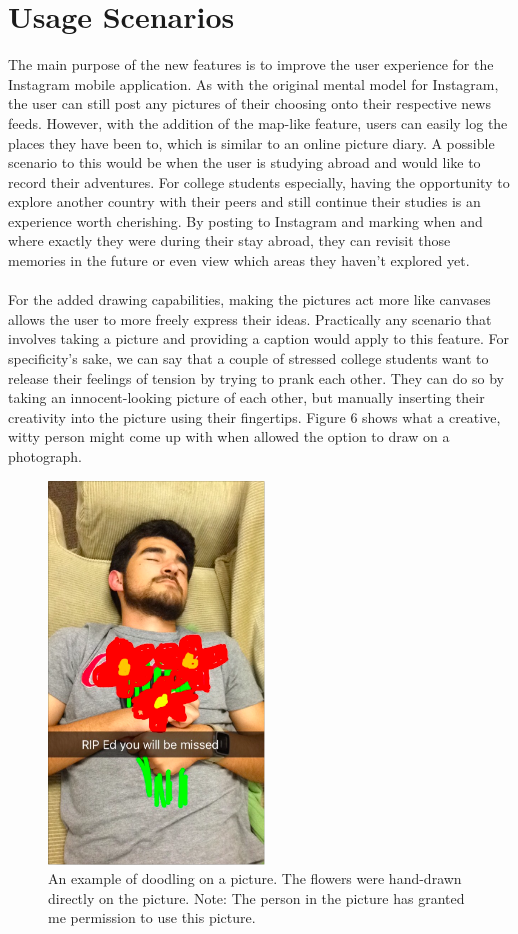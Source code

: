 \documentclass[11pt]{article}
\begin{document}
\pagebreak
   
\section{Usage Scenarios}
\label{Usage Scenarios}
   \indent
   \indent The main purpose of the new features is to improve the user experience for the Instagram mobile application. As with the original mental model for Instagram, the user can still post any pictures of their choosing onto their respective news feeds. However, with the addition of the map-like feature, users can easily log the places they have been to, which is similar to an online picture diary. A possible scenario to this would be when the user is studying abroad and would like to record their adventures. For college students especially, having the opportunity to explore another country with their peers and still continue their studies is an experience worth cherishing. By posting to Instagram and marking when and where exactly they were during their stay abroad, they can revisit those memories in the future or even view which areas they haven't explored yet. \\ \\
   \indent For the added drawing capabilities, making the pictures act more like canvases allows the user to more freely express their ideas. Practically any scenario that involves taking a picture and providing a caption would apply to this feature. For specificity's sake, we can say that a couple of stressed college students want to release their feelings of tension by trying to prank each other. They can do so by taking an innocent-looking picture of each other, but manually inserting their creativity into the picture using their fingertips. Figure 6 shows what a creative, witty person might come up with when allowed the option to draw on a photograph.

\begin{figure}[ht]
\centering
\includegraphics[height=4in]{images/rip_ed.png}
\caption{An example of doodling on a picture. The flowers were hand-drawn directly on the picture. Note: The person in the picture has granted me permission to use this picture.}
\label{ed}
\end{figure}
\end{document}
